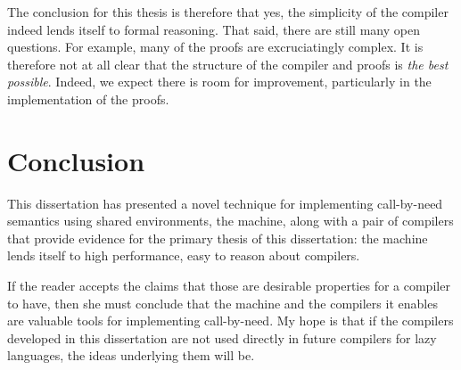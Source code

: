 The conclusion for this thesis is therefore that yes, the simplicity of the
compiler indeed lends itself to formal reasoning. That said, there are still
many open questions. For example, many of the proofs are excruciatingly complex.
It is therefore not at all clear that the structure of the compiler and proofs
is \emph{the best possible}. Indeed, we expect there is room for improvement,
particularly in the implementation of the proofs. 

\section{Conclusion}

This dissertation has presented a novel technique for implementing call-by-need
semantics using shared environments, the \ce machine, along with a pair of
compilers that provide evidence for the primary thesis of this dissertation: the
\ce machine lends itself to high performance, easy to reason about compilers. 

If the reader accepts the claims that those are desirable properties for a
compiler to have, then she must conclude that the \ce machine and the compilers
it enables are valuable tools for implementing call-by-need. My hope is that
if the compilers developed in this dissertation are not used directly in
future compilers for lazy languages, the ideas underlying them will be. 


